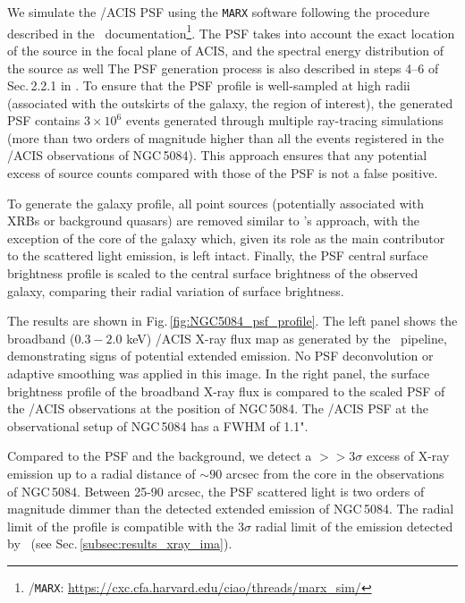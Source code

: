 \documentclass[modern]{CORE-AAS/aastex631}
\begin{document}
{We simulate the \Chandra/ACIS PSF using the \texttt{MARX} software following the procedure described in the \ciao\ documentation\footnote{\ciao/\texttt{MARX}: \url{https://cxc.cfa.harvard.edu/ciao/threads/marx_sim/}}. The PSF takes into account the exact location of the source in the focal plane of ACIS, and the spectral energy distribution of the source as well The PSF generation process is also described in steps 4--6 of Sec.\,2.2.1 in \citet{borlaff+2024apj967_169}. To ensure that the PSF profile is well-sampled at high radii (associated with the outskirts of the galaxy, the region of interest), the generated PSF contains $3\times10^6$ events generated through multiple ray-tracing simulations (more than two orders of magnitude higher than all the events registered in the \Chandra/ACIS observations of NGC\,5084). This approach ensures that any potential excess of source counts compared with those of the PSF is not a false positive.

To generate the galaxy profile, all point sources (potentially associated with XRBs or background quasars) are removed similar to \SAUNAS's approach, with the exception of the core of the galaxy which, given its role as the main contributor to the scattered light emission, is left intact. Finally, the PSF central surface brightness profile is scaled to the central surface brightness of the observed galaxy, comparing their radial variation of surface brightness.

The results are shown in Fig.\,\ref{fig:NGC5084_psf_profile}. The left panel shows the broadband ($0.3-2.0$ keV) \Chandra/ACIS X-ray flux map as generated by the \ciao\ pipeline, demonstrating signs of potential extended emission. No PSF deconvolution or adaptive smoothing was applied in this image. In the right panel, the surface brightness profile of the broadband X-ray flux is compared to the scaled PSF of the \Chandra/ACIS observations at the position of NGC\,5084. The \Chandra/ACIS PSF at the observational setup of NGC\,5084 has a FWHM of 1.1".

Compared to the PSF and the background, we detect a $>>3\sigma$ excess of X-ray emission up to a radial distance of $\sim90$ arcsec from the core in the observations of NGC\,5084. Between 25-90 arcsec, the PSF scattered light is two orders of magnitude dimmer than the detected extended emission of NGC\,5084. The radial limit of the profile is compatible with the $3\sigma$ radial limit of the emission detected by \SAUNAS\ (see Sec.\,\ref{subsec:results_xray_ima}).

}
\end{document}
